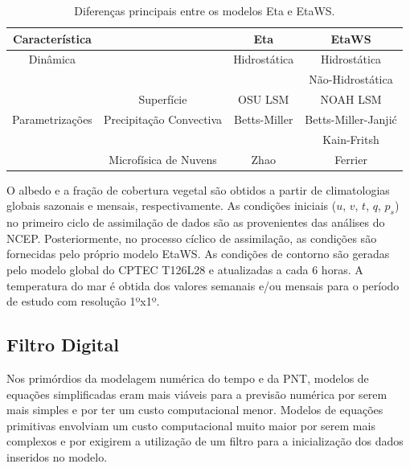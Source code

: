 \begin{table}[ht]
\caption{Diferenças principais entre os modelos Eta e EtaWS.}
\label{tab01}
\centering
\begin{tabular}{c|c|c|c}
\hline
Característica      &                                 & Eta               & EtaWS                    \\
\hline
Dinâmica            &                                 & Hidrostática  & Hidrostática         \\
                        &                                 &                   & Não-Hidrostática \\
                        & Superfície                  & OSU LSM           & NOAH LSM                 \\
Parametrizações & Precipitação Convectiva & Betts-Miller      & Betts-Miller-Janji\'{c}  \\
                        &                                 &                   & Kain-Fritsh              \\
                        & Microfísica de Nuvens       & Zhao              & Ferrier                  \\
\hline
\end{tabular}
\end{table}

O albedo e a fração de cobertura vegetal são obtidos a partir de climatologias globais sazonais e mensais, respectivamente. As condições iniciais ($u$, $v$, $t$, $q$, $p_{s}$) no primeiro ciclo de assimilação de dados são as provenientes das análises do NCEP. Posteriormente, no processo cíclico de assimilação, as condições são fornecidas pelo próprio modelo EtaWS. As condições de contorno são geradas pelo modelo global do CPTEC T126L28 e atualizadas a cada 6 horas. A temperatura do mar é obtida dos valores semanais e/ou mensais para o período de estudo com resolução 1ºx1º.

\subsection{Filtro Digital}

Nos primórdios da modelagem numérica do tempo e da PNT, modelos de equações simplificadas eram mais viáveis para a previsão numérica por serem mais simples e por ter um custo computacional menor. Modelos de equações primitivas envolviam um custo computacional muito maior por serem mais complexos e por exigirem a utilização de um filtro para a inicialização dos dados inseridos no modelo. 

